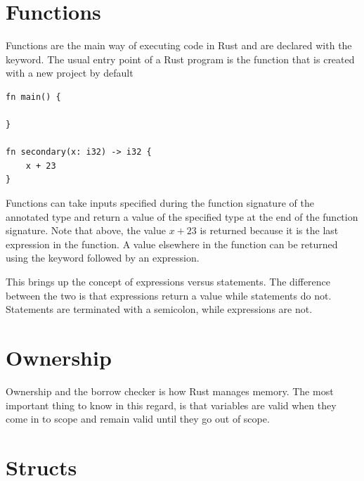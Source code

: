 \documentclass[]{article}
\begin{document}
\section{Functions}

Functions are the main way of executing code in Rust and are declared with the  keyword.
The usual entry point of a Rust program is the  function that is created with a new project by default
\begin{verbatim}
fn main() {

}

fn secondary(x: i32) -> i32 {
    x + 23
}
\end{verbatim}
Functions can take inputs specified during the function signature of the annotated type and return a value of the specified type at the end of the function signature.
Note that above, the value $x+23$ is returned because it is the last expression in the function. A value elsewhere in the function can be returned using the keyword  followed by an expression.

This brings up the concept of expressions versus statements.
The difference between the two is that expressions return a value while statements do not.
Statements are terminated with a semicolon, while expressions are not.
\section{Ownership}

Ownership and the borrow checker is how Rust manages memory.
The most important thing to know in this regard, is that variables are valid when they come in to scope and remain valid until they go out of scope.

\section{Structs}
\end{document}
